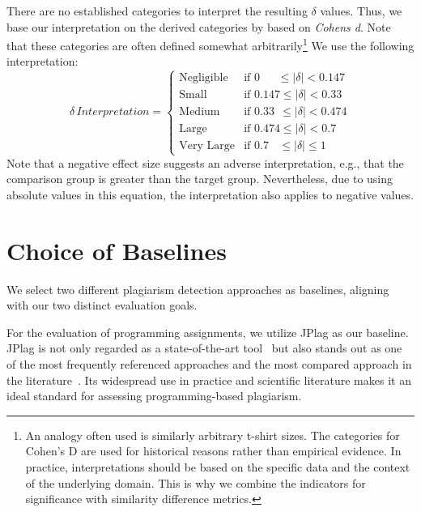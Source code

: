 There are no established categories to interpret the resulting $\delta$ values. Thus, we base our interpretation on the derived categories by \citet{Romano2006} based on \textit{Cohens d}.
Note that these categories are often defined somewhat arbitrarily\footnote{An analogy often used is similarly arbitrary t-shirt sizes. The categories for Cohen's D are used for historical reasons rather than empirical evidence. In practice, interpretations should be based on the specific data and the context of the underlying domain. This is why we combine the indicators for significance with similarity difference metrics.} We use the following interpretation:
\begin{equation}
    \delta \, \textit{Interpretation}=
    \begin{cases}
        \text{Negligible} & \text{if } 0\ \ \ \ \ \ \ \leq \lvert \delta \rvert < 0.147 \\
        \text{Small} & \text{if } 0.147  \leq \lvert \delta \rvert < 0.33 \\
        \text{Medium} & \text{if } 0.33 \ \ \leq \lvert \delta \rvert < 0.474 \\
        \text{Large} & \text{if } 0.474  \leq \lvert \delta \rvert < 0.7 \\
        \text{Very Large} & \text{if } 0.7 \ \ \ \ \leq \lvert \delta \rvert \leq 1
    \end{cases}
\end{equation}
Note that a negative effect size suggests an adverse interpretation, e.g., that the comparison group is greater than the target group. Nevertheless, due to using absolute values in this equation, the interpretation also applies to negative values.

\section{Choice of Baselines}\label{sec:baselines}
We select two different plagiarism detection approaches as baselines, aligning with our two distinct evaluation goals.

For the evaluation of programming assignments, we utilize JPlag as our baseline. JPlag is not only regarded as a state-of-the-art tool~\cite{Aniceto2021, Novak2019} but also stands out as one of the most frequently referenced approaches and the most compared approach in the literature~\cite{Novak2019}. Its widespread use in practice and scientific literature makes it an ideal standard for assessing programming-based plagiarism.

